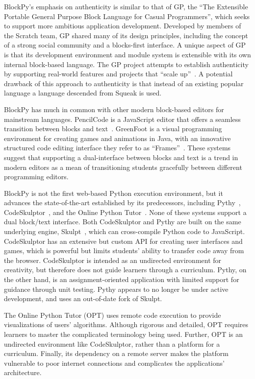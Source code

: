 \documentclass[10pt,journal,compsoc]{IEEEtran}
\begin{document}
BlockPy's emphasis on authenticity is similar to that of GP, the ``The Extensible Portable General Purpose Block Language for Casual Programmers'', which seeks to support more ambitious application development.
Developed by members of the Scratch team, GP shared many of its design principles, including the concept of a strong social community and a blocks-first interface.
A unique aspect of GP is that its development environment and module system is extensible with its own internal block-based language.
The GP project attempts to establish authenticity by supporting real-world features and projects that ``scale up''~\cite{gp-paper}.
A potential drawback of this approach to authenticity is that instead of an existing popular language a language descended from Squeak is used.

BlockPy has much in common with other modern block-based editors for mainstream languages. 
PencilCode is a JavaScript editor that offers a seamless transition between blocks and text~\cite{Bau}.
GreenFoot is a visual programming environment for creating games and animations in Java, with an innovative structured code editing interface they refer to as ``Frames''~\cite{altadmri2016building}.
These systems suggest that supporting a dual-interface between blocks and text is a trend in modern editors as a mean of transitioning students gracefully between different programming editors.

BlockPy is not the first web-based Python execution environment, but it advances the state-of-the-art established by its predecessors, including Pythy~\cite{pythy}, CodeSkulptor~\cite{CodeSkulptor-Tang}, and the Online Python Tutor~\cite{Guo:2013}. 
None of these systems support a dual block/text interface.
Both CodeSkulptor and Pythy are built on the same underlying engine, Skulpt~\cite{graham2010skulpt}, which can cross-compile Python code to JavaScript.
CodeSkulptor has an extensive but custom API for creating user interfaces and games, which is powerful but limits students' ability to transfer code away from the browser.
CodeSkulptor is intended as an undirected environment for creativity, but therefore does not guide learners through a curriculum.
Pythy, on the other hand, is an assignment-oriented application with limited support for guidance through unit testing.
Pythy appears to no longer be under active development, and uses an out-of-date fork of Skulpt.

The Online Python Tutor (OPT) uses remote code execution to provide visualizations of users' algorithms. 
Although rigorous and detailed, OPT requires learners to master the complicated terminology being used.
Further, OPT is an undirected environment like CodeSkulptor, rather than a platform for a curriculum.
Finally, its dependency on a remote server makes the platform vulnerable to poor internet connections and complicates the applications' architecture.
\end{document}

